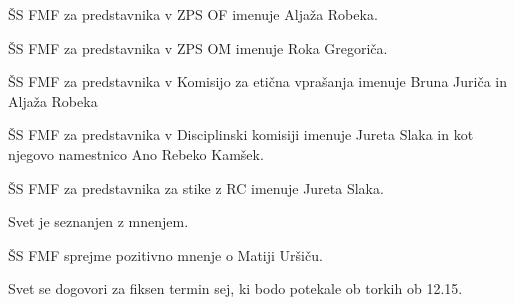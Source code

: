 \documentclass{seja}
\begin{document}
\begin{ad}
\begin{sklep*}
ŠS FMF za predstavnika v ZPS OF imenuje Aljaža Robeka.
\end{sklep*}
\begin{sklep*}
ŠS FMF za predstavnika v ZPS OM imenuje Roka Gregoriča.
\end{sklep*}
\begin{sklep*}
ŠS FMF za predstavnika v Komisijo za etična vprašanja imenuje Bruna
Juriča in Aljaža Robeka
\end{sklep*}
\begin{sklep*}
ŠS FMF za predstavnika v Disciplinski komisiji imenuje Jureta Slaka
in kot njegovo namestnico Ano Rebeko Kamšek.
\end{sklep*}
\begin{sklep*}
ŠS FMF za predstavnika za stike z RC imenuje Jureta Slaka.
\end{sklep*}

\item
Svet je seznanjen z mnenjem.
\begin{sklep*}
ŠS FMF sprejme pozitivno mnenje o Matiji Uršiču.
\end{sklep*}

\item
Svet se dogovori za fiksen termin sej, ki bodo potekale ob torkih ob 12.15.
\end{ad}

\makeatletter \global\let\@enddocumenthook\@empty \makeatother
{}
\end{document}
